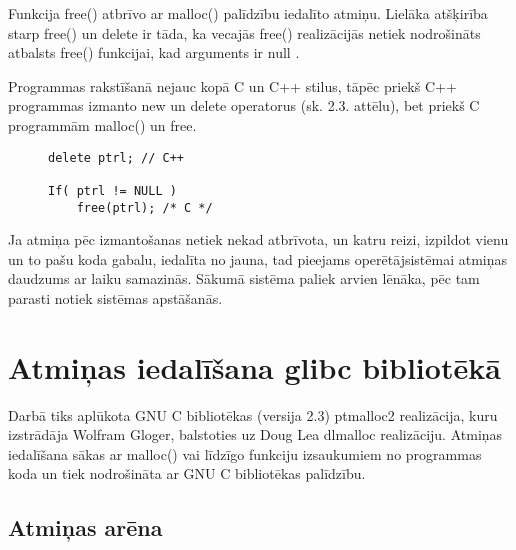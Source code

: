 Funkcija free() atbrīvo ar malloc() palīdzību iedalīto atmiņu.
Lielāka atšķirība starp free() un delete ir tāda, ka vecajās free() realizācijās netiek nodrošināts atbalsts free() funkcijai, kad arguments ir null \cite{POCF}. 

Programmas rakstīšanā nejauc kopā C un C++ stilus, tāpēc priekš C++ programmas izmanto 
new un delete operatorus (sk. 2.3. attēlu), bet priekš C programmām malloc() un free.


\begin{figure}[h]
\begin{lstlisting}
delete ptrl; // C++

If( ptrl != NULL )
	free(ptrl); /* C */
\end{lstlisting}
\caption{\textbf{\fontsize{11}{12}\selectfont {Dinamiskās atmiņas atbrīvošana C un C++}}}
\end{figure}


Ja atmiņa pēc izmantošanas netiek nekad atbrīvota, un katru reizi, izpildot vienu un to pašu koda gabalu, iedalīta no jauna, tad pieejams operētājsistēmai atmiņas daudzums ar laiku samazinās.
Sākumā sistēma paliek arvien lēnāka, pēc tam parasti notiek sistēmas apstāšanās.






\section{Atmiņas iedalīšana glibc bibliotēkā}
Darbā tiks aplūkota GNU C bibliotēkas (versija 2.3) ptmalloc2 realizācija, kuru izstrādāja Wolfram Gloger, balstoties uz Doug Lea dlmalloc realizāciju. 
Atmiņas iedalīšana sākas ar malloc() vai līdzīgo funkciju izsaukumiem no programmas koda un tiek nodrošināta ar GNU C bibliotēkas palīdzību. 




\subsection{Atmiņas arēna}

